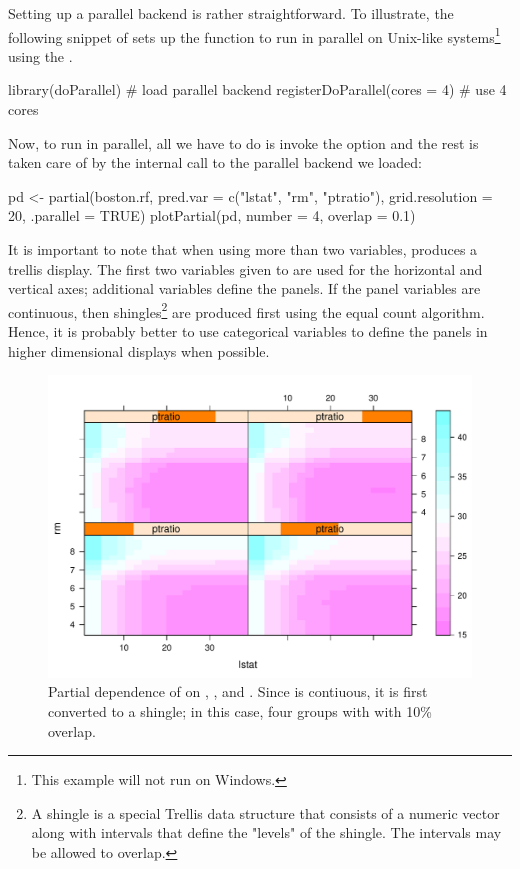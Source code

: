 Setting up a parallel backend is rather straightforward. To illustrate, the following snippet of sets up the  function to run in parallel on Unix-like systems\footnote{This example will not run on Windows.} using the .
\begin{example}
library(doParallel)  # load parallel backend
registerDoParallel(cores = 4)  # use 4 cores
\end{example}
Now, to run  in parallel, all we have to do is invoke the  option and the rest is taken care of by the internal call to  the parallel backend we loaded:
\begin{example}
pd <- partial(boston.rf, pred.var = c("lstat", "rm", "ptratio"),
              grid.resolution = 20, .parallel = TRUE)
plotPartial(pd, number = 4, overlap = 0.1)
\end{example}

It is important to note that when using more than two variables,  produces a trellis display. The first two variables given to  are used for the horizontal and vertical axes; additional variables define the panels. If the panel variables are continuous, then shingles\footnote{A shingle is a special Trellis data structure that consists of a numeric vector along with intervals that define the "levels" of the shingle. The intervals may be allowed to overlap.} are produced first using the equal count algorithm. Hence, it is probably better to use categorical variables to define the panels in higher dimensional displays when possible.

\begin{figure}[htbp]
  \centering
  \includegraphics[width=0.8\linewidth]{partial_par}
  \caption{Partial dependence of  on , , and . Since  is contiuous, it is first converted to a shingle; in this case, four groups with with 10\% overlap.}
  \label{fig:partial_par}
\end{figure}

